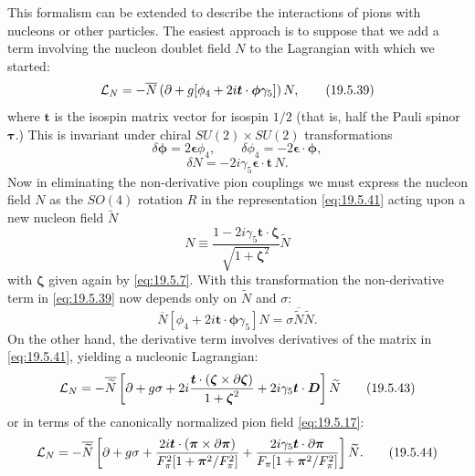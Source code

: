 This formalism can be extended to describe the interactions of pions with nucleons or other particles. The easiest approach is to suppose that we add a term involving the nucleon doublet field $N$ to the Lagrangian with which we started:
\begin{equation}
\mathcal L_N
=-\overline N\left(
\sl{\partial}
+g[\phi_4+2i\boldsymbol t\cdot\boldsymbol{\phi}\gamma_5]
\right)N,
\tag{19.5.39}\label{eq:19.5.39}
\end{equation}
where $\boldsymbol t$ is the isospin matrix vector for isospin $1/2$ (that is, half the Pauli spinor $\boldsymbol{\tau}$.) This is invariant under chiral $SU(2)\times SU(2)$ transformations
\begin{equation}
\delta\boldsymbol{\phi}=2\boldsymbol{\epsilon}\phi_4,
\qquad
\delta\phi_4=-2\boldsymbol{\epsilon}\cdot\boldsymbol{\phi},
\tag{19.5.40}\label{eq:19.5.40}
\end{equation}
\begin{equation}
\delta N=-2i\gamma_5\boldsymbol{\epsilon}\cdot\boldsymbol t\,N.
\tag{19.5.41}\label{eq:19.5.41}
\end{equation}
Now in eliminating the non-derivative pion couplings we must express the nucleon field $N$ as the $SO(4)$ rotation $R$ in the representation \eqref{eq:19.5.41} acting upon a new nucleon field $\widetilde N$
\begin{equation}
N\equiv
\frac{1-2i\gamma_5\boldsymbol t\cdot\boldsymbol{\zeta}}
{\sqrt{1+\boldsymbol{\zeta}^2}}\widetilde N
\tag{19.5.42}\label{eq:19.5.42}
\end{equation}
with $\boldsymbol{\zeta}$ given again by \eqref{eq:19.5.7}. With this transformation the non-derivative term in \eqref{eq:19.5.39} now depends only on $\widetilde N$ and $\sigma$:
\[
\overline N[\phi_4+2i\boldsymbol t\cdot\boldsymbol{\phi}\gamma_5]N
=\sigma\overline{\widetilde N}\widetilde N.
\]
On the other hand, the derivative term involves derivatives of the matrix in \eqref{eq:19.5.41}, yielding a nucleonic Lagrangian:
\begin{equation}
\mathcal L_N
=-\overline{\widetilde N}
\left[
\sl{\partial}+g\sigma
+2i\frac{\boldsymbol t\cdot
(\boldsymbol{\zeta}\times\sl{\partial}\boldsymbol{\zeta})}
{1+\boldsymbol{\zeta}^2}
+2i\gamma_5\boldsymbol t\cdot\sl{\boldsymbol D}
\right]\widetilde N
\tag{19.5.43}\label{eq:19.5.43}
\end{equation}
or in terms of the canonically normalized pion field \eqref{eq:19.5.17}:
\begin{equation}
\mathcal L_N
=-\overline{\widetilde N}
\left[
\sl{\partial}+g\sigma
+\frac{2i\boldsymbol t\cdot
(\boldsymbol{\pi}\times\sl{\partial}\boldsymbol{\pi})}
{F_\pi^2[1+\boldsymbol{\pi}^2/F_\pi^2]}
+\frac{2i\gamma_5\boldsymbol t\cdot
\sl{\partial}\boldsymbol{\pi}}
{F_\pi[1+\boldsymbol{\pi}^2/F_\pi^2]}
\right]\widetilde N.
\tag{19.5.44}\label{eq:19.5.44}
\end{equation}

